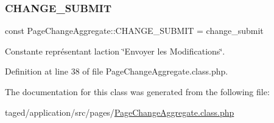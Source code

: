 \subsubsection{\texorpdfstring{C\+H\+A\+N\+G\+E\+\_\+\+S\+U\+B\+M\+IT}{CHANGE\_SUBMIT}}
{\footnotesize\ttfamily const Page\+Change\+Aggregate\+::\+C\+H\+A\+N\+G\+E\+\_\+\+S\+U\+B\+M\+IT = \textquotesingle{}change\+\_\+submit\textquotesingle{}}

Constante représentant l\textquotesingle{}action \char`\"{}\+Envoyer les Modifications\char`\"{}. 

Definition at line 38 of file Page\+Change\+Aggregate.\+class.\+php.



The documentation for this class was generated from the following file\+:\begin{DoxyCompactItemize}
\item 
taged/application/src/pages/\hyperlink{_page_change_aggregate_8class_8php}{Page\+Change\+Aggregate.\+class.\+php}\end{DoxyCompactItemize}
